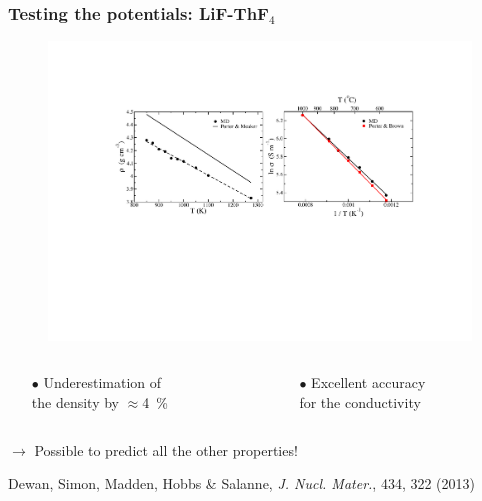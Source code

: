 \documentclass{beamer}
\begin{document}
\begin{frame}
   \frametitle{Testing the potentials: LiF-ThF$_4$}

   \begin{figure}
   \includegraphics[width=\textwidth]{dewan-valid}
   \end{figure}

   \begin{columns}
      \begin{column}{6cm}
        \begin{itemize}
           \item[$\bullet$] Underestimation of \\ the density by $\approx$4~\%
        \end{itemize}
      \end{column}
      \begin{column}{6cm}
        \begin{itemize}
           \item[$\bullet$] Excellent accuracy \\ for the conductivity
        \end{itemize}
      \end{column}
   \end{columns}
\vspace{0.5cm}

\begin{center}
$\rightarrow$ Possible to predict all the other properties!
\end{center}

   \scriptsize{Dewan, Simon, Madden, Hobbs \& Salanne, {\it J. Nucl. Mater.}, 434, 322 (2013)}
\end{frame}
\end{document}
